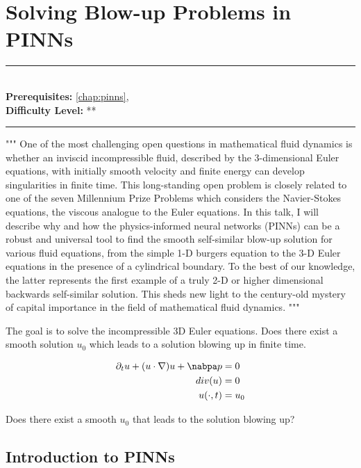 \documentclass[book.tex]{subfiles}
\begin{document}
\chapter{Solving Blow-up Problems in PINNs}

\label{chap:pinns_blowup}
\noindent\rule{11cm}{0.4pt} \\
\textbf{Prerequisites:} \autoref{chap:pinns},  \\
\textbf{Difficulty Level:} ** \\
\noindent\rule{11cm}{0.4pt}
\vspace{5mm}
"""
One of the most challenging open questions in mathematical fluid dynamics is whether an inviscid incompressible fluid, described by the 3-dimensional Euler equations, with initially smooth velocity and finite energy can develop singularities in finite time. This long-standing open problem is closely related to one of the seven Millennium Prize Problems which considers the Navier-Stokes equations, the viscous analogue to the Euler equations. In this talk, I will describe why and how the physics-informed neural networks (PINNs) can be a robust and universal tool to find the smooth self-similar blow-up solution for various fluid equations, from the simple 1-D burgers equation to the 3-D Euler equations in the presence of a cylindrical boundary. To the best of our knowledge, the latter represents the first example of a truly 2-D or higher dimensional backwards self-similar solution. This sheds new light to the century-old mystery of capital importance in the field of mathematical fluid dynamics.
"""

The goal is to solve the incompressible 3D Euler equations. Does there exist a smooth solution $u_0$ which leads to a solution blowing up in finite time.

\begin{align}
\partial_t u + (u \cdot \nabla )u + \nabpa p &= 0 \\
div(u) &= 0 \\
u(\cdot, t) &= u_0
\end{align}

Does there exist a smooth $u_0$ that leads to the solution blowing up? 

\section{Introduction to PINNs}
\end{document}
